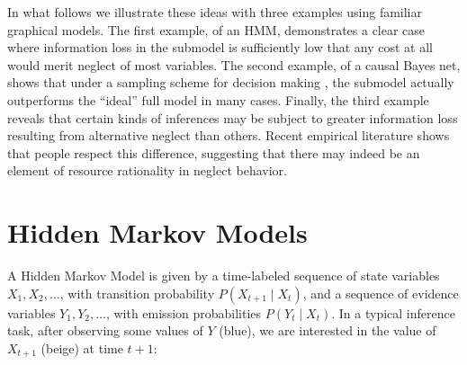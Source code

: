 \documentclass[10pt,letterpaper]{article}
\begin{document}
In what follows we illustrate these ideas with three examples using familiar graphical models. The first example, of an HMM, demonstrates a clear case where information loss in the submodel is sufficiently low that any cost at all would merit neglect of most variables. The second example, of a causal Bayes net, shows that under a sampling scheme for decision making \citep{Vul2014}, the submodel actually outperforms the ``ideal'' full model in many cases. Finally, the third example reveals that certain kinds of inferences may be subject to greater information loss resulting from alternative neglect than others. Recent empirical literature shows that people respect this difference, suggesting that there may indeed be an element of resource rationality in neglect behavior.

\section{Hidden Markov Models}

A Hidden Markov Model is given by a time-labeled sequence of state variables $X_1,X_2,\dots$, with transition probability $P(X_{t+1}\mid X_t)$, and a sequence of evidence variables $Y_1,Y_2,\dots$, with emission probabilities $P(Y_t\mid X_t)$. In a typical inference task, after observing some values of $Y$ (blue), we are interested in the value of $X_{t+1}$ (beige) at time $t+1$:
\end{document}
